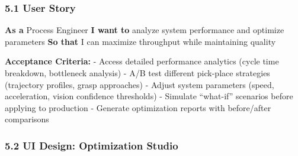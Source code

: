 \documentclass[
]{article}
\begin{document}
\hypertarget{user-story-2}{%
\subsubsection{5.1 User Story}\label{user-story-2}}

\textbf{As a} Process Engineer \textbf{I want to} analyze system
performance and optimize parameters \textbf{So that} I can maximize
throughput while maintaining quality

\textbf{Acceptance Criteria:} - Access detailed performance analytics
(cycle time breakdown, bottleneck analysis) - A/B test different
pick-place strategies (trajectory profiles, grasp approaches) - Adjust
system parameters (speed, acceleration, vision confidence thresholds) -
Simulate ``what-if'' scenarios before applying to production - Generate
optimization reports with before/after comparisons

\hypertarget{ui-design-optimization-studio}{%
\subsubsection{5.2 UI Design: Optimization
Studio}\label{ui-design-optimization-studio}}
\end{document}
